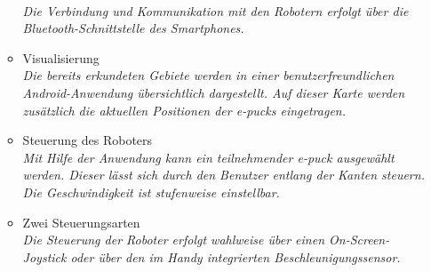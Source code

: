 \documentclass[10pt,a4paper]{article}
\begin{document}
\begin{itemize}
\begin{itemize}
						\\ \textsl{Die Verbindung und Kommunikation mit den Robotern erfolgt über die Bluetooth-Schnittstelle des
							Smartphones.}
					\item Visualisierung
						\\ \textsl{Die bereits erkundeten Gebiete werden in einer benutzerfreundlichen Android-Anwendung übersichtlich
							dargestellt. Auf dieser Karte werden zusätzlich die aktuellen Positionen der e-pucks eingetragen.}		
					\item Steuerung des Roboters
						\\ \textsl{Mit Hilfe der Anwendung kann ein teilnehmender e-puck ausgewählt werden. Dieser lässt sich
							durch den Benutzer entlang der Kanten steuern. Die Geschwindigkeit ist stufenweise einstellbar.}		
					\item Zwei Steuerungsarten
						\\ \textsl{Die Steuerung der Roboter erfolgt wahlweise über einen On-Screen-Joystick oder über
							den im Handy integrierten Beschleunigungssensor.}											
				\end{itemize}
			\end{itemize}
\end{document}
